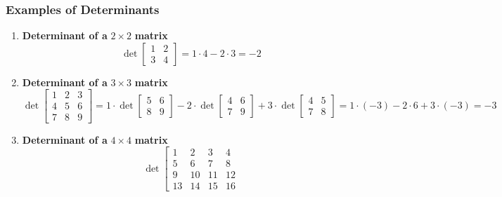 \documentclass[titlepage,a4paper]{article}
\begin{document}
			\subsubsection{Examples of Determinants}
				\begin{enumerate}
					\item \textbf{Determinant of a} $2\times2$ \textbf{matrix}
						\begin{equation}
							\det
							\left[
								\begin{matrix}
									1 & 2 \\
									3 & 4
								\end{matrix}
							\right]
							=1\cdot4-2\cdot3=-2
						\end{equation}
					\item \textbf{Determinant of a} $3\times3$ \textbf{matrix}
						\begin{equation}
							\det
							\left[
								\begin{matrix}
									1 & 2 & 3 \\
									4 & 5 & 6 \\
									7 & 8 & 9
								\end{matrix}
							\right]
							=1\cdot\det
							\left[
								\begin{matrix}
									5 & 6 \\
									8 & 9
								\end{matrix}
							\right]
							-2\cdot\det
							\left[
								\begin{matrix}
									4 & 6 \\
									7 & 9
								\end{matrix}
							\right]
							+3\cdot\det
							\left[
								\begin{matrix}
									4 & 5 \\
									7 & 8
								\end{matrix}
							\right]
							=1\cdot(-3)-2\cdot6+3\cdot(-3)=-3
						\end{equation}
					\item \textbf{Determinant of a} $4\times4$ \textbf{matrix}
						\begin{equation}
							\det
							\left[
								\begin{matrix}
									1 & 2 & 3 & 4 \\
									5 & 6 & 7 & 8 \\
									9 & 10 & 11 & 12 \\
									13 & 14 & 15 & 16
								\end{matrix}

\end{equation}
\end{enumerate}
\end{document}
